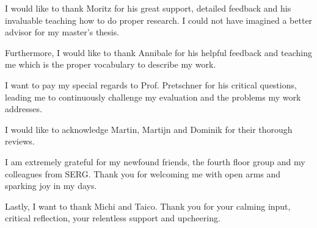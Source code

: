 \documentclass[\myrootdir/main.tex]{subfiles}
\begin{document}
\thispagestyle{empty}

\vspace*{2cm}

\begin{center}
{ \myAcknowTitle}
\end{center}

\vspace{1cm}
\noindent
I would like to thank Moritz for his great support, detailed feedback and his invaluable teaching how to do proper research.
I could not have imagined a better advisor for my master's thesis.

\noindent
Furthermore, I would like to thank Annibale for his helpful feedback and teaching me which is the proper vocabulary to describe my work.

\noindent
I want to pay my special regards to Prof. Pretschner for his critical questions, leading me to continuously challenge my evaluation and the problems my work addresses.

\noindent
I would like to acknowledge Martin, Martijn and Dominik for their thorough reviews.

\noindent
I am extremely grateful for my newfound friends, the fourth floor group and my colleagues from SERG.
Thank you for welcoming me with open arms and sparking joy in my days.

\noindent
Lastly, I want to thank Michi and Taico.
Thank you for your calming input, critical reflection, your relentless support and upcheering.

\end{document}
